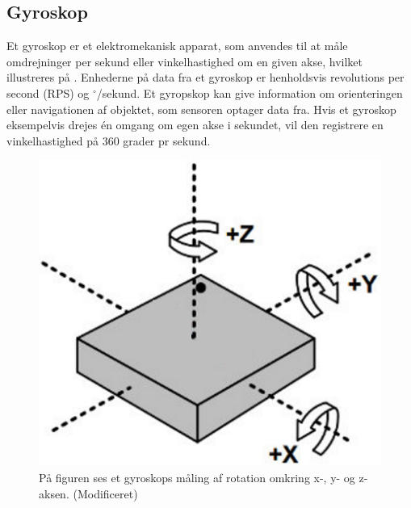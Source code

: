 \subsection{Gyroskop}
Et gyroskop er et elektromekanisk apparat, som anvendes til at måle omdrejninger per sekund eller vinkelhastighed om en given akse, hvilket illustreres på . Enhederne på data fra et gyroskop er henholdsvis revolutions per second (RPS) og $^\circ$/sekund. \newline
Et gyropskop kan give information om orienteringen eller navigationen af objektet, som sensoren optager data fra. Hvis et gyroskop eksempelvis drejes én omgang om egen akse i sekundet, vil den registrere en vinkelhastighed på 360 grader pr sekund. \citep{Sparkfun_gyro,Barbour2014}
\begin{figure}[H]
	\centering
	\includegraphics[scale=0.6]{figures/bProblemloesning/gyro.png}
	\caption{På figuren ses et gyroskops måling af rotation omkring x-, y- og z-aksen. \citep{Sparkfun_gyro} (Modificeret)}
	\label{fig:gyro}
\end{figure}

